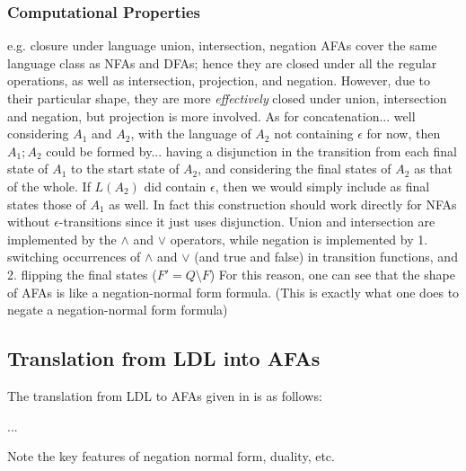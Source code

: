 \subsubsection{Computational Properties}

e.g. closure under language union, intersection, negation
AFAs cover the same language class as NFAs and DFAs; hence they are closed under all the regular operations,
as well as intersection, projection, and negation.
However, due to their particular shape, they are more \emph{effectively} closed under union, intersection and negation,
but projection is more involved. As for concatenation... well considering $A_1$ and $A_2$,
with the language of $A_2$ not containing $\epsilon$ for now, then $A_1;A_2$ could be formed by...
having a disjunction in the transition from each final state of $A_1$ to the start state of $A_2$,
and considering the final states of $A_2$ as that of the whole.
If $L(A_2)$ did contain $\epsilon$, then we would simply include as final states those of $A_1$ as well.
In fact this construction should work directly for NFAs without $\epsilon$-transitions since it just uses disjunction.
Union and intersection are implemented by the $\land$ and $\lor$ operators,
while negation is implemented by 1. switching occurrences of $\land$ and $\lor$
(and true and false) in transition functions, and
2. flipping the final states ($F' = Q \setminus{F}$)
For this reason, one can see that the shape of AFAs is like a negation-normal form formula.
(This is exactly what one does to negate a negation-normal form formula)

\subsection{Translation from LDL into AFAs}

The translation from LDL to AFAs given in \cite{ldlf} is as follows:

...

Note the key features of negation normal form, duality, etc.
